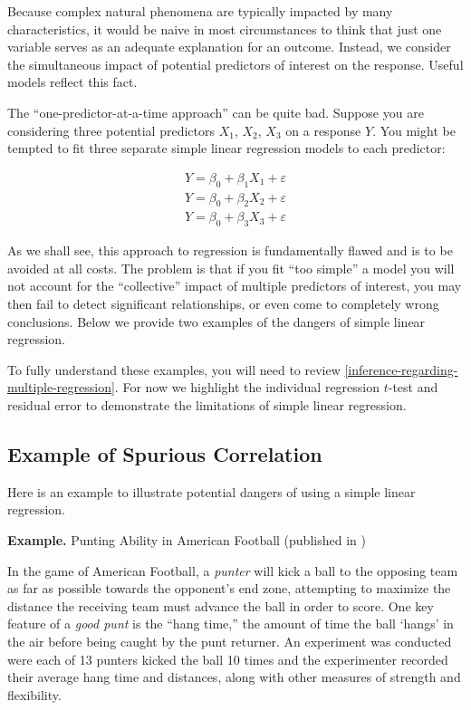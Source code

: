 \documentclass[
]{book}
\begin{document}
Because complex natural phenomena are typically impacted by many characteristics, it would be naive in most circumstances to think that just one variable serves as an adequate explanation for an outcome.
Instead, we consider the simultaneous impact of potential predictors of interest on the response.
Useful models reflect this fact.

The ``one-predictor-at-a-time approach'' can be quite bad.
Suppose you are considering three potential predictors \(X_1\), \(X_2\), \(X_3\) on a response \(Y\).
You might be tempted to fit three separate simple linear regression models to each predictor:

\[\begin{array}{c}
Y = \beta_0 + \beta_1 X_1 + \varepsilon \\
Y = \beta_0 + \beta_2 X_2 + \varepsilon \\
Y = \beta_0 + \beta_3 X_3 + \varepsilon
\end{array}\]

As we shall see, this approach to regression is fundamentally flawed and is to be avoided at all costs.
The problem is that if you fit ``too simple'' a model you will not account for the ``collective'' impact of multiple predictors of interest, you may then fail to detect significant relationships, or even come to completely wrong conclusions.
Below we provide two examples of the dangers of simple linear regression.

To fully understand these examples, you will need to review \ref{inference-regarding-multiple-regression}.
For now we highlight the individual regression \(t\)-test and residual error to demonstrate the limitations of simple linear regression.

\hypertarget{example-of-spurious-correlation}{%
\subsection{Example of Spurious Correlation}\label{example-of-spurious-correlation}}

Here is an example to illustrate potential dangers of using a simple linear regression.

\textbf{Example.} Punting Ability in American Football (published in \citet{Walpole2007})

In the game of American Football, a \emph{punter} will kick a ball to the opposing team as far as possible towards the opponent's end zone, attempting to maximize the distance the receiving team must advance the ball in order to score.
One key feature of a \emph{good punt} is the ``hang time,'' the amount of time the ball `hangs' in the air before being caught by the punt returner.
An experiment was conducted were each of 13 punters kicked the ball 10 times and the experimenter recorded their average hang time and distances, along with other measures of strength and flexibility.
\end{document}
